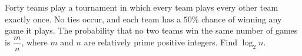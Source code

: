 Forty teams play a tournament in which every team plays every other team exactly once. No ties occur, and each team has a $50\%$ chance of winning any game it plays. The probability that no two teams win the same number of games is $\dfrac {m}{n}$, where $m$ and $n$ are relatively prime positive integers. Find $\log_2 n$.
